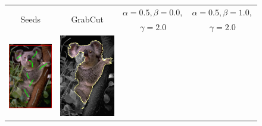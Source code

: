 \begin{figure}
\center
\begin{tabular}{cccc}
\multirow{2}{*}{Seeds} & \multirow{2}{*}{GrabCut} & $\alpha=0.5, \beta=0.0,$ & $\alpha=0.5, \beta=1.0,$\\
& & $\gamma=2.0$ & $\gamma=2.0$\\
 	\includegraphics[scale=0.25]{figures/chapter7/segmentation/coala/k-0.0/seeds.png} & 
 	\includegraphics[scale=0.25]{figures/chapter7/segmentation/coala/k-0.0/gc-seg.png} &  	

\end{tabular}
\end{figure}
